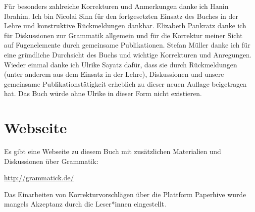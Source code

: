 Für besonders zahlreiche Korrekturen und Anmerkungen danke ich Hanin Ibrahim.
Ich bin Nicolai Sinn für den fortgesetzten Einsatz des Buches in der Lehre und konstruktive Rückmeldungen dankbar.
Elizabeth Pankratz danke ich für Diskussionen zur Grammatik allgemein und für die Korrektur meiner Sicht auf Fugenelemente durch gemeinsame Publikationen.
Stefan Müller danke ich für eine gründliche Durchsicht des Buchs und wichtige Korrekturen und Anregungen.
Wieder einmal danke ich Ulrike Sayatz dafür, dass sie durch Rückmeldungen (unter anderem aus dem Einsatz in der Lehre), Diskussionen und unsere gemeinsame Publikationstätigkeit erheblich zu dieser neuen Auflage beigetragen hat.
Das Buch würde ohne Ulrike in dieser Form nicht existieren.

\section*{Webseite}
\label{sec:webseite}

Es gibt eine Webseite zu diesem Buch mit zusätzlichen Materialien und Diskussionen über Grammatik:

\begin{center}
  \url{http://grammatick.de/}
\end{center}

Das Einarbeiten von Korrekturvorschlägen über die Plattform Paperhive wurde mangels Akzeptanz durch die Leser*innen eingestellt.
